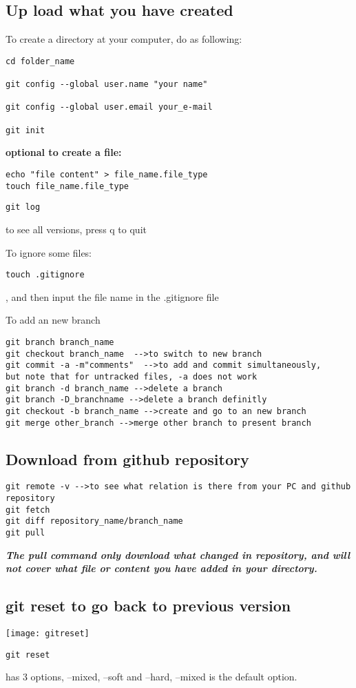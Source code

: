 \documentclass[UTF8]{article}
\begin{document}
\subsection{Up load what you have created}
To create a directory at your computer, do as following:  \begin{verbatim}
cd folder_name

git config --global user.name "your name"

git config --global user.email your_e-mail

git init
\end{verbatim}
\textbf{optional to create a file:}
\begin{verbatim}
echo "file content" > file_name.file_type
touch file_name.file_type
\end{verbatim}

\begin{verbatim}
git log 
\end{verbatim} to see all versions, press q to quit

To ignore some files:
\begin{verbatim}
touch .gitignore
\end{verbatim}, and then input the file name in the .gitignore file

To add an new branch
\begin{verbatim}
git branch branch_name
git checkout branch_name  -->to switch to new branch
git commit -a -m"comments"  -->to add and commit simultaneously, 
but note that for untracked files, -a does not work
git branch -d branch_name -->delete a branch
git branch -D_branchname -->delete a branch definitly
git checkout -b branch_name -->create and go to an new branch
git merge other_branch -->merge other branch to present branch
\end{verbatim}

\subsection{Download from github repository}

\begin{verbatim}
git remote -v -->to see what relation is there from your PC and github repository
git fetch 
git diff repository_name/branch_name
git pull 
\end{verbatim}

\textbf{\textit{The pull command only download what changed in repository, and will not cover what file or content you have added in your directory. }}

\subsection{git reset to go back to previous version}
\texttt{[image: gitreset]}
\begin{verbatim}
git reset 
\end{verbatim}
has 3 options, --mixed, --soft and --hard, --mixed is the default option. 
\end{document}
